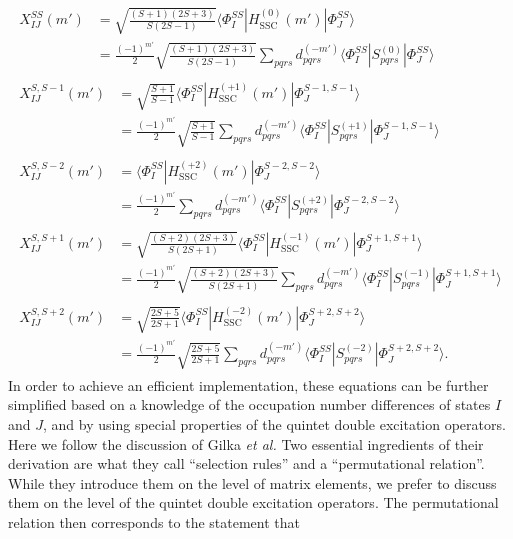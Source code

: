 	\begin{align}
	\begin{split}
  X_{IJ}^{SS}(m') &= \sqrt {\frac{{(S + 1)(2S + 3)}}{{S(2S - 1)}}} \langle \Phi _I^{SS}|H_{{\text{SSC}}}^{(0)}(m')|\Phi _J^{SS}\rangle   \\
   &= \frac{{{{( - 1)}^{m'}}}}{2}\sqrt {\frac{{(S + 1)(2S + 3)}}{{S(2S - 1)}}} \sum\limits_{pqrs} {d_{pqrs}^{( - m')}} \langle \Phi _I^{SS}|S_{pqrs}^{(0)}|\Phi _J^{SS}\rangle 
\end{split} \\
\begin{split}
  X_{IJ}^{S,S - 1}(m') &= \sqrt {\frac{{S + 1}}{{S - 1}}} \langle \Phi _I^{SS}|H_{{\text{SSC}}}^{( + 1)}(m')|\Phi _J^{S - 1,S - 1}\rangle   \\
   &= \frac{{{{( - 1)}^{m'}}}}{2}\sqrt {\frac{{S + 1}}{{S - 1}}} \sum\limits_{pqrs} {d_{pqrs}^{( - m')}} \langle \Phi _I^{SS}|S_{pqrs}^{( + 1)}|\Phi _J^{S - 1,S - 1}\rangle 
\end{split} \\
\begin{split}
  X_{IJ}^{S,S - 2}(m') &= \langle \Phi _I^{SS}|H_{{\text{SSC}}}^{( + 2)}(m')|\Phi _J^{S - 2,S - 2}\rangle   \\
   &= \frac{{{{( - 1)}^{m'}}}}{2}\sum\limits_{pqrs} {d_{pqrs}^{( - m')}} \langle \Phi _I^{SS}|S_{pqrs}^{( + 2)}|\Phi _J^{S - 2,S - 2}\rangle 
\end{split} \\
\begin{split}
  X_{IJ}^{S,S + 1}(m') &= \sqrt {\frac{{(S + 2)(2S + 3)}}{{S(2S + 1)}}} \langle \Phi _I^{SS}|H_{{\text{SSC}}}^{( - 1)}(m')|\Phi _J^{S + 1,S + 1}\rangle   \\
   &= \frac{{{{( - 1)}^{m'}}}}{2}\sqrt {\frac{{(S + 2)(2S + 3)}}{{S(2S + 1)}}} \sum\limits_{pqrs} {d_{pqrs}^{( - m')}} \langle \Phi _I^{SS}|S_{pqrs}^{( - 1)}|\Phi _J^{S + 1,S + 1}\rangle  
\end{split} \\
\begin{split}
  X_{IJ}^{S,S + 2}(m') &= \sqrt {\frac{{2S + 5}}{{2S + 1}}} \langle \Phi _I^{SS}|H_{{\text{SSC}}}^{( - 2)}(m')|\Phi _J^{S + 2,S + 2}\rangle   \\
   &= \frac{{{{( - 1)}^{m'}}}}{2}\sqrt {\frac{{2S + 5}}{{2S + 1}}} \sum\limits_{pqrs} {d_{pqrs}^{( - m')}} \langle \Phi _I^{SS}|S_{pqrs}^{( - 2)}|\Phi _J^{S + 2,S + 2}\rangle. 
\end{split} 
\end{align} 	
In order to achieve an efficient implementation, these equations can be further simplified based on a knowledge of the occupation number differences of states $I$ and $J$, and by using special properties of the quintet double excitation operators. Here we follow the discussion of Gilka \textit{et al.}\cite{GilkaTM_2008_44102} Two essential ingredients of their derivation are what they call “selection rules” and a “permutational relation”. While they introduce them on the level of matrix elements, we prefer to discuss them on the level of the quintet double excitation operators. The permutational relation then corresponds to the statement that 
